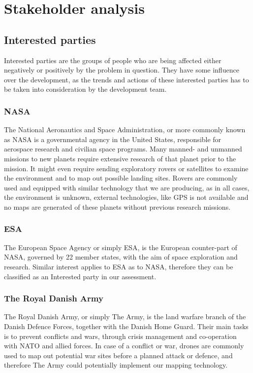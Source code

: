 \section{Stakeholder analysis}
	
\subsection{Interested parties}
Interested parties are the groups of people who are being affected either negatively or positively by the problem in question. They have some influence over the development, as the trends and actions of these interested parties has to be taken into consideration by the development team.

\subsubsection{NASA}
The National Aeronautics and Space Administration, or more commonly known as NASA is a governmental agency in the United States, responsible for aerospace research and civilian space programs. Many manned- and unmanned missions to new planets require extensive research of that planet prior to the mission. It might even require sending exploratory rovers or satellites to examine the environment and to map out possible landing sites. Rovers are commonly used and equipped with similar technology that we are producing, as in all cases, the environment is unknown, external technologies, like GPS is not available and no maps are generated of these planets without previous research missions. 

\subsubsection{ESA}
The European Space Agency or simply ESA, is the European counter-part of NASA, governed by 22 member states, with the aim of space exploration and research. Similar interest applies to ESA as to NASA, therefore they can be classified as an Interested party in our assessment.

\subsubsection{The Royal Danish Army}
The Royal Danish Army, or simply The Army, is the land warfare branch of the Danish Defence Forces, together with the Danish Home Guard. Their main tasks is to prevent conflicts and wars, through crisis management and co-operation with NATO and allied forces\cite{armytasks}. In case of a conflict or war, drones are commonly used to map out potential war sites before a planned attack or defence, and therefore The Army could potentially implement our mapping technology.

